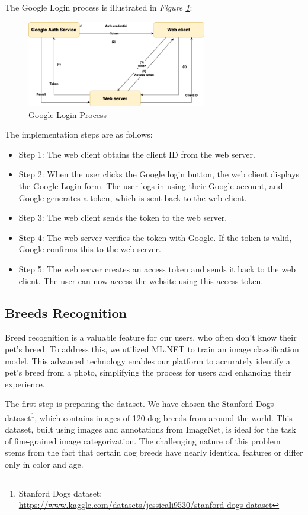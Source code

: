 The Google Login process is illustrated in \emph{Figure \ref{fig:gglogin-flow}}:
\begin{figure}[H]
    \centering
    \includegraphics[width=0.7\textwidth]{Figures/Implementation/GoogleLogin.png}
    \caption{Google Login Process}
    \label{fig:gglogin-flow}
\end{figure}

The implementation steps are as follows:
\begin{itemize}
    \item Step 1: The web client obtains the client ID from the web server.
    \item Step 2: When the user clicks the Google login button, the web client displays the Google Login form. The user logs in using their Google account, and Google generates a token, which is sent back to the web client.
    \item Step 3: The web client sends the token to the web server.
    \item Step 4: The web server verifies the token with Google. If the token is valid, Google confirms this to the web server.
    \item Step 5: The web server creates an access token and sends it back to the web client. The user can now access the website using this access token.
\end{itemize}

\subsection{Breeds Recognition}
Breed recognition is a valuable feature for our users, who often don't know their pet's breed. To address this, we utilized ML.NET
to train an image classification model. This advanced technology enables our platform to accurately identify a pet's breed from a photo,
simplifying the process for users and enhancing their experience.

The first step is preparing the dataset. We have chosen the Stanford Dogs dataset\footnote{Stanford Dogs dataset: \url{https://www.kaggle.com/datasets/jessicali9530/stanford-dogs-dataset}}, which contains images of 120 dog breeds from around
the world. This dataset, built using images and annotations from ImageNet, is ideal for the task of fine-grained image categorization.
The challenging nature of this problem stems from the fact that certain dog breeds have nearly identical features or differ only in color and age.

